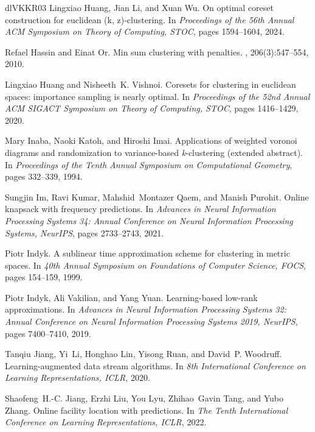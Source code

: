 \documentclass[10pt,a4paper]{amsart}
\begin{document}
\begin{thebibliography}{dlVKKR03}
Lingxiao Huang, Jian Li, and Xuan Wu.
\newblock On optimal coreset construction for euclidean (k, z)-clustering.
\newblock In {\em Proceedings of the 56th Annual {ACM} Symposium on Theory of Computing, {STOC}}, pages 1594--1604, 2024.

Refael Hassin and Einat Or.
\newblock Min sum clustering with penalties.
, 206(3):547--554, 2010.

Lingxiao Huang and Nisheeth~K. Vishnoi.
\newblock Coresets for clustering in euclidean spaces: importance sampling is nearly optimal.
\newblock In {\em Proceedings of the 52nd Annual {ACM} {SIGACT} Symposium on Theory of Computing, {STOC}}, pages 1416--1429, 2020.

Mary Inaba, Naoki Katoh, and Hiroshi Imai.
\newblock Applications of weighted voronoi diagrams and randomization to variance-based \emph{k}-clustering (extended abstract).
\newblock In {\em Proceedings of the Tenth Annual Symposium on Computational Geometry}, pages 332--339, 1994.

Sungjin Im, Ravi Kumar, Mahshid~Montazer Qaem, and Manish Purohit.
\newblock Online knapsack with frequency predictions.
\newblock In {\em Advances in Neural Information Processing Systems 34: Annual Conference on Neural Information Processing Systems, NeurIPS}, pages 2733--2743, 2021.

Piotr Indyk.
\newblock A sublinear time approximation scheme for clustering in metric spaces.
\newblock In {\em 40th Annual Symposium on Foundations of Computer Science, {FOCS}}, pages 154--159, 1999.

Piotr Indyk, Ali Vakilian, and Yang Yuan.
\newblock Learning-based low-rank approximations.
\newblock In {\em Advances in Neural Information Processing Systems 32: Annual Conference on Neural Information Processing Systems 2019, NeurIPS}, pages 7400--7410, 2019.

Tanqiu Jiang, Yi~Li, Honghao Lin, Yisong Ruan, and David~P. Woodruff.
\newblock Learning-augmented data stream algorithms.
\newblock In {\em 8th International Conference on Learning Representations, {ICLR}}, 2020.

Shaofeng~H.{-}C. Jiang, Erzhi Liu, You Lyu, Zhihao~Gavin Tang, and Yubo Zhang.
\newblock Online facility location with predictions.
\newblock In {\em The Tenth International Conference on Learning Representations, {ICLR}}, 2022.


\end{thebibliography}
\end{document}
